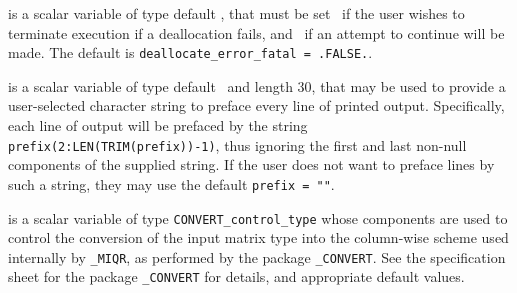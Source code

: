 \documentclass{galahad}
\newcommand{\packagename}{MIQR}
\newcommand{\fullpackagename}{\libraryname\_\packagename}
\begin{document}
\begin{description}
 is a scalar variable of type default \logical, 
that must be set \true\ if the user wishes to terminate execution if
a deallocation  fails, and \false\ if an attempt to continue
will be made. The default is {\tt deallocate\_error\_fatal = .FALSE.}.

 is a scalar variable of type default \character\
and length 30, that may be used to provide a user-selected 
character string to preface every line of printed output. 
Specifically, each line of output will be prefaced by the string 
{\tt prefix(2:LEN(TRIM(prefix))-1)},
thus ignoring the first and last non-null components of the
supplied string. If the user does not want to preface lines by such
a string, they may use the default {\tt prefix = ""}.

 is a scalar variable of type 
{\tt CONVERT\_control\_type}
whose components are used to control the conversion of the
input matrix type into the column-wise scheme used internally
by  {\tt \fullpackagename}, as performed by the package 
{\tt \libraryname\_CONVERT}. 
See the specification sheet for the package 
{\tt \libraryname\_CONVERT} 
for details, and appropriate default values.

\end{description}

\end{document}
